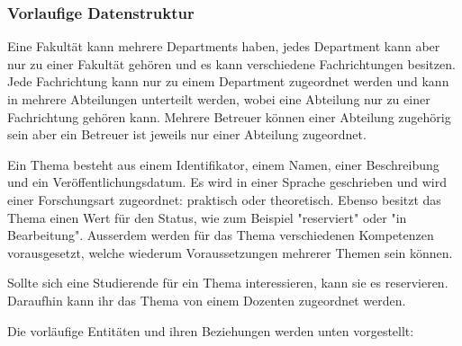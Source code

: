 \subsubsection{Vorlaufige Datenstruktur}
Eine Fakult\"at kann mehrere Departments haben, jedes Department kann aber nur zu einer Fakult\"at geh\"oren und es kann verschiedene Fachrichtungen besitzen.
Jede Fachrichtung kann nur zu einem Department zugeordnet werden und kann in mehrere Abteilungen unterteilt werden, wobei eine Abteilung nur zu einer Fachrichtung geh\"oren kann.
Mehrere Betreuer k\"onnen einer Abteilung zugeh\"orig sein aber ein Betreuer ist jeweils nur einer Abteilung zugeordnet.

Ein Thema besteht aus einem Identifikator, einem Namen, einer Beschreibung und ein Ver\"offentlichungsdatum. Es wird in einer Sprache geschrieben und wird einer Forschungsart zugeordnet: praktisch oder theoretisch. Ebenso besitzt das Thema einen Wert f\"ur den Status, wie zum Beispiel "reserviert" oder "in Bearbeitung". Au{ss}erdem werden f\"ur das Thema verschiedenen Kompetenzen vorausgesetzt, welche wiederum Voraussetzungen mehrerer Themen sein k\"onnen.

Sollte sich eine Studierende f\"ur ein Thema interessieren, kann sie es reservieren. Daraufhin kann ihr das Thema von einem Dozenten zugeordnet werden.

Die vorl\"aufige Entit\"aten und ihren Beziehungen werden unten vorgestellt: